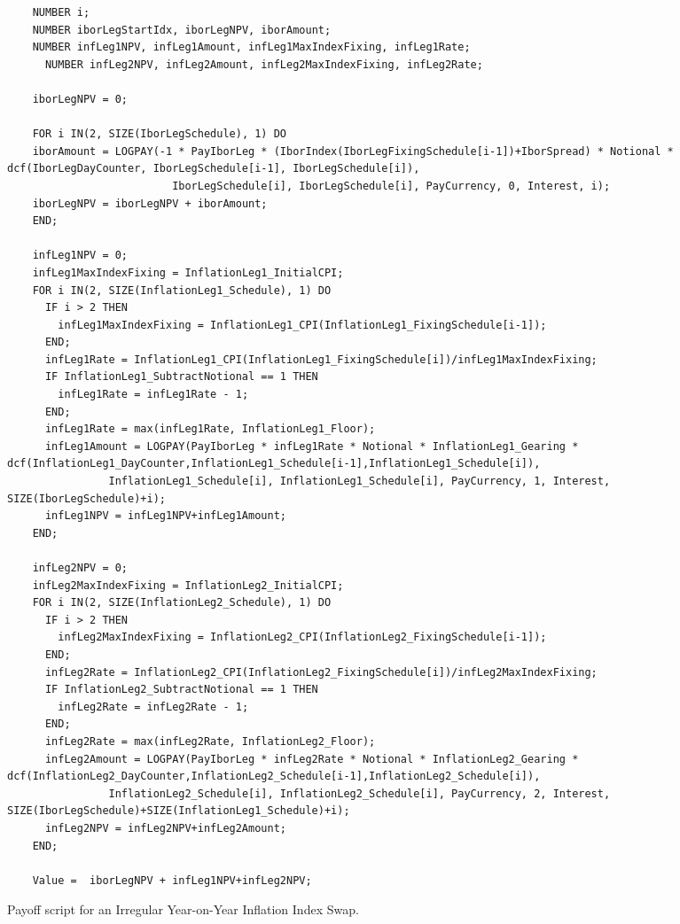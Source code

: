 \begin{listing}[hbt]
  \begin{verbatim} 
    NUMBER i;
    NUMBER iborLegStartIdx, iborLegNPV, iborAmount;
    NUMBER infLeg1NPV, infLeg1Amount, infLeg1MaxIndexFixing, infLeg1Rate;
      NUMBER infLeg2NPV, infLeg2Amount, infLeg2MaxIndexFixing, infLeg2Rate;

    iborLegNPV = 0;
    
    FOR i IN(2, SIZE(IborLegSchedule), 1) DO
    iborAmount = LOGPAY(-1 * PayIborLeg * (IborIndex(IborLegFixingSchedule[i-1])+IborSpread) * Notional * dcf(IborLegDayCounter, IborLegSchedule[i-1], IborLegSchedule[i]),
                          IborLegSchedule[i], IborLegSchedule[i], PayCurrency, 0, Interest, i);
    iborLegNPV = iborLegNPV + iborAmount;
    END;
    
    infLeg1NPV = 0;
    infLeg1MaxIndexFixing = InflationLeg1_InitialCPI;
    FOR i IN(2, SIZE(InflationLeg1_Schedule), 1) DO
      IF i > 2 THEN 
        infLeg1MaxIndexFixing = InflationLeg1_CPI(InflationLeg1_FixingSchedule[i-1]);
      END;
      infLeg1Rate = InflationLeg1_CPI(InflationLeg1_FixingSchedule[i])/infLeg1MaxIndexFixing;
      IF InflationLeg1_SubtractNotional == 1 THEN
        infLeg1Rate = infLeg1Rate - 1;
      END;
      infLeg1Rate = max(infLeg1Rate, InflationLeg1_Floor);
      infLeg1Amount = LOGPAY(PayIborLeg * infLeg1Rate * Notional * InflationLeg1_Gearing * dcf(InflationLeg1_DayCounter,InflationLeg1_Schedule[i-1],InflationLeg1_Schedule[i]),
                InflationLeg1_Schedule[i], InflationLeg1_Schedule[i], PayCurrency, 1, Interest, SIZE(IborLegSchedule)+i);
      infLeg1NPV = infLeg1NPV+infLeg1Amount;
    END;
    
    infLeg2NPV = 0;
    infLeg2MaxIndexFixing = InflationLeg2_InitialCPI;
    FOR i IN(2, SIZE(InflationLeg2_Schedule), 1) DO
      IF i > 2 THEN 
        infLeg2MaxIndexFixing = InflationLeg2_CPI(InflationLeg2_FixingSchedule[i-1]);
      END;
      infLeg2Rate = InflationLeg2_CPI(InflationLeg2_FixingSchedule[i])/infLeg2MaxIndexFixing;
      IF InflationLeg2_SubtractNotional == 1 THEN
        infLeg2Rate = infLeg2Rate - 1;
      END;
      infLeg2Rate = max(infLeg2Rate, InflationLeg2_Floor);
      infLeg2Amount = LOGPAY(PayIborLeg * infLeg2Rate * Notional * InflationLeg2_Gearing * dcf(InflationLeg2_DayCounter,InflationLeg2_Schedule[i-1],InflationLeg2_Schedule[i]),
                InflationLeg2_Schedule[i], InflationLeg2_Schedule[i], PayCurrency, 2, Interest, SIZE(IborLegSchedule)+SIZE(InflationLeg1_Schedule)+i);
      infLeg2NPV = infLeg2NPV+infLeg2Amount;
    END;
    
    Value =  iborLegNPV + infLeg1NPV+infLeg2NPV;
\end{verbatim}
  \caption{Payoff script for an Irregular Year-on-Year Inflation Index Swap.}
  \label{lst:irregularYYIIS}
\end{listing}

